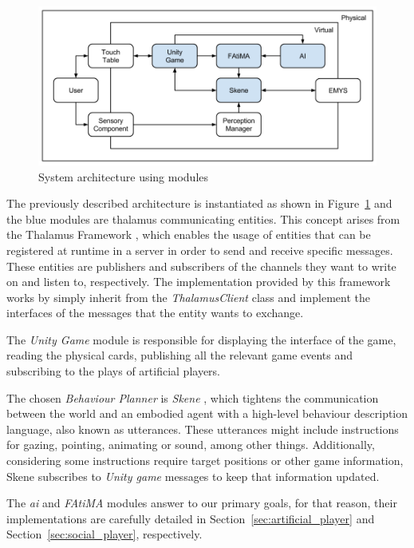 \begin{figure}[ht]
  \centering
    \includegraphics[width=1\textwidth]{./img/6/model}
  \caption{System architecture using modules}
\label{fig:model}
\end{figure}

The previously described architecture is instantiated as shown in Figure~\ref{fig:model} and the blue modules are thalamus communicating entities.
This concept arises from the Thalamus Framework \cite{Ribeiro}, which enables the usage of entities that can be registered at runtime in a server in order to send and receive specific messages.
These entities are publishers and subscribers of the channels they want to write on and listen to, respectively.
The implementation provided by this framework works by simply inherit from the \emph{ThalamusClient} class and implement the interfaces of the messages that the entity wants to exchange.

The \emph{Unity Game} module is responsible for displaying the interface of the game, reading the physical cards, publishing all the relevant game events and subscribing to the plays of artificial players.

The chosen \emph{Behaviour Planner} is \emph{Skene} \cite{Ribeiroa}, which tightens the communication between the world and an embodied agent with a high-level behaviour description language, also known as utterances.
These utterances might include instructions for gazing, pointing, animating or sound, among other things.
Additionally, considering some instructions require target positions or other game information, Skene subscribes to \emph{Unity game} messages to keep that information updated.

The \emph{\ac{ai}} and \emph{FAtiMA} modules answer to our primary goals, for that reason, their implementations are carefully detailed in Section~\ref{sec:artificial_player} and Section~\ref{sec:social_player}, respectively.
